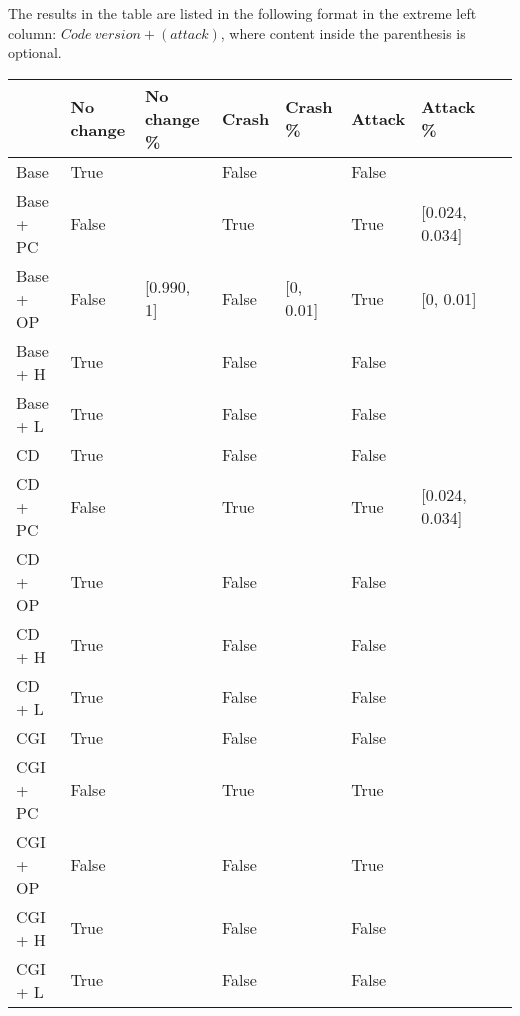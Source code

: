 The results in the table are listed in the following format in the extreme left column: $Code\:version + (attack)$, where content inside the parenthesis is optional.

\begin{table}[H]
    \begin{tabular}{l|l|l|l|l|l|l|l}
    ~         & No change & No change \% & Crash & Crash \% & Attack & Attack \% \\ \hline
    Base      & True &\relax[0.990, 1] & False & \relax[0, 0.01] & False & \relax[0, 0.01] ~   & ~ \\
    Base + PC & False & \relax[0.854, 0.864] & True & \relax[0.108, 0.118] & True & [0.024, 0.034]   & ~ \\
    Base + OP & False & [0.990, 1] & False & [0, 0.01] & True & [0, 0.01]   & ~ \\
    Base + H  & True &\relax[0.990, 1] & False & \relax[0, 0.01] & False & \relax[0, 0.01]   & ~ \\
    Base + L  & True &\relax[0.990, 1] & False & \relax[0, 0.01] & False & \relax[0, 0.01]   & ~ \\
    CD        & True &\relax[0.990, 1] & False & \relax[0, 0.01] & False & \relax[0, 0.01]   & ~ \\
    CD + PC   & False & \relax[0.853, 0.863] & True & \relax[0.108, 0.118] & True & [0.024, 0.034]    & ~ \\
    CD + OP   & True &\relax[0.990, 1] & False & \relax[0, 0.01] & False & \relax[0, 0.01]  & ~ \\
    CD + H    & True &\relax[0.990, 1] & False & \relax[0, 0.01] & False & \relax[0, 0.01]  & ~ \\
    CD + L    & True &\relax[0.990, 1] & False & \relax[0, 0.01] & False & \relax[0, 0.01]  & ~ \\
    CGI       & True &\relax[0.990, 1] & False & \relax[0, 0.01] & False & \relax[0, 0.01]  & ~ \\
    CGI + PC  & False & \relax[0.723, 0.733] & True & \relax[0.227, 0.237] & True & \relax[0.031, 0.041]  & ~ \\
    CGI + OP  & False & \relax[0.990, 1] & False & \relax[0, 0.01] & True & \relax[0, 0.01]    & ~ \\
    CGI + H   & True &\relax[0.990, 1] & False & \relax[0, 0.01] & False & \relax[0,0.01]  & ~ \\
    CGI + L   & True & \relax[0.990, 1] & False & \relax[0, 0.01] & False & \relax[0,0.01]& ~ \\

\end{tabular}
\end{table}
